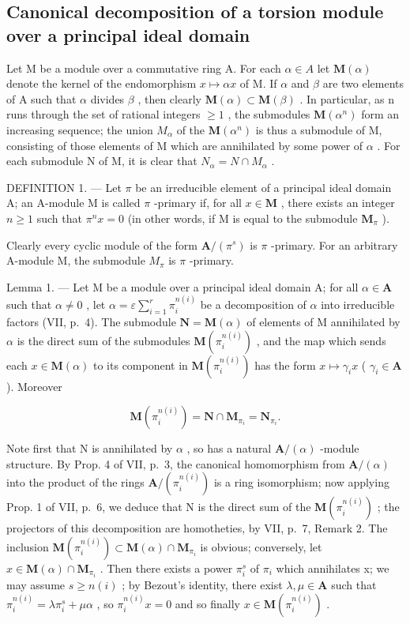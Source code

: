 \subsection{Canonical decomposition of a torsion module over a principal ideal domain}

Let M be a module over a commutative ring A. For each \(\alpha\in A\) let \(\mathbf{M}(\alpha)\) denote the kernel of the endomorphism \(x\mapsto\alpha x\) of M. If \(\alpha\) and \(\beta\) are two elements of A such that \(\alpha\) divides \(\beta\) , then clearly \(\mathbf{M}(\alpha)\subset\mathbf{M}(\beta)\) . In particular, as n runs through the set of rational integers \(\geqslant1\) , the submodules \(\mathbf{M}(\alpha^{n})\) form an increasing sequence; the union \(M_{\alpha}\) of the \(\mathbf{M}(\alpha^{n})\) is thus a submodule of M, consisting of those elements of M which are annihilated by some power of \(\alpha\) . For each submodule N of M, it is clear that \(N_{\alpha}=N\cap M_{\alpha}\) .

DEFINITION 1. --- Let \(\pi\) be an irreducible element of a principal ideal domain A; an A-module M is called \(\pi\) -primary if, for all \(x \in \mathbf{M}\) , there exists an integer \(n \geqslant 1\) such that \(\pi^n x = 0\) (in other words, if M is equal to the submodule \(\mathbf{M}_{\pi}\) ).

Clearly every cyclic module of the form \(\mathbf{A}/(\pi^{s})\) is \(\pi\) -primary. For an arbitrary A-module M, the submodule \(M_{\pi}\) is \(\pi\) -primary.

Lemma 1. --- Let M be a module over a principal ideal domain A; for all \(\alpha \in \mathbf{A}\) such that \(\alpha \neq 0\) , let \(\alpha = \varepsilon \sum_{i=1}^{r} \pi_i^{n(i)}\) be a decomposition of \(\alpha\) into irreducible factors (VII, p.~4). The submodule \(\mathbf{N} = \mathbf{M}(\alpha)\) of elements of M annihilated by \(\alpha\) is the direct sum of the submodules \(\mathbf{M}(\pi_i^{n(i)})\) , and the map which sends each \(x \in \mathbf{M}(\alpha)\) to its component in \(\mathbf{M}(\pi_i^{n(i)})\) has the form \(x \mapsto \gamma_i x\) ( \(\gamma_i \in \mathbf{A}\) ). Moreover

\[
\mathbf {M} \left(\pi_ {i} ^ {n (i)}\right) = \mathbf {N} \cap \mathbf {M} _ {\pi_ {i}} = \mathbf {N} _ {\pi_ {i}}.
\]

Note first that N is annihilated by \(\alpha\) , so has a natural \(\mathbf{A}/(\alpha)\) -module structure. By Prop. 4 of VII, p.~3, the canonical homomorphism from \(\mathbf{A}/(\alpha)\) into the product of the rings \(\mathbf{A}/(\pi_{i}^{n(i)})\) is a ring isomorphism; now applying Prop. 1 of VII, p.~6, we deduce that N is the direct sum of the \(\mathbf{M}(\pi_{i}^{n(i)})\) ; the projectors of this decomposition are homotheties, by VII, p.~7, Remark 2. The inclusion \(\mathbf{M}(\pi_{i}^{n(i)})\subset\mathbf{M}(\alpha)\cap\mathbf{M}_{\pi_{i}}\) is obvious; conversely, let \(x\in\mathbf{M}(\alpha)\cap\mathbf{M}_{\pi_{i}}\) . Then there exists a power \(\pi_{i}^{s}\) of \(\pi_{i}\) which annihilates x; we may assume \(s\geqslant n(i)\) ; by Bezout's identity, there exist \(\lambda,\mu\in\mathbf{A}\) such that \(\pi_{i}^{n(i)}=\lambda\pi_{i}^{s}+\mu\alpha\) , so \(\pi_{i}^{n(i)}x=0\) and so finally \(x\in\mathbf{M}(\pi_{i}^{n(i)})\) .

